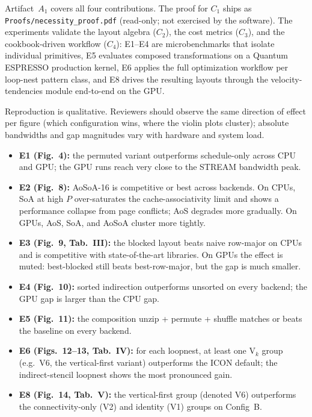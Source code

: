 \documentclass[conference]{IEEEtran}
\begin{document}
Artifact~$A_1$ covers all four contributions. The proof for $C_1$ ships as \texttt{Proofs/necessity\_proof.pdf} (read-only; not exercised by the software). The experiments validate the layout algebra ($C_2$), the cost metrics ($C_3$), and the cookbook-driven workflow ($C_4$): E1--E4 are microbenchmarks that isolate individual primitives, E5 evaluates composed transformations on a Quantum ESPRESSO production kernel, E6 applies the full optimization workflow per loop-nest pattern class, and E8 drives the resulting layouts through the velocity-tendencies module end-to-end on the GPU.

\artexp

Reproduction is qualitative. Reviewers should observe the same direction of effect per figure (which configuration wins, where the violin plots cluster); absolute bandwidths and gap magnitudes vary with hardware and system load.

\begin{itemize}\setlength{\itemsep}{1pt}\setlength{\parsep}{0pt}
\item \textbf{E1 (Fig.~4):} the permuted variant outperforms schedule-only across CPU and GPU; the GPU runs reach very close to the STREAM bandwidth peak.
\item \textbf{E2 (Fig.~8):} AoSoA-16 is competitive or best across backends. On CPUs, SoA at high $P$ over-saturates the cache-associativity limit and shows a performance collapse from page conflicts; AoS degrades more gradually. On GPUs, AoS, SoA, and AoSoA cluster more tightly.
\item \textbf{E3 (Fig.~9, Tab.~III):} the blocked layout beats naive row-major on CPUs and is competitive with state-of-the-art libraries. On GPUs the effect is muted: best-blocked still beats best-row-major, but the gap is much smaller.
\item \textbf{E4 (Fig.~10):} sorted indirection outperforms unsorted on every backend; the GPU gap is larger than the CPU gap.
\item \textbf{E5 (Fig.~11):} the composition unzip + permute + shuffle matches or beats the baseline on every backend.
\item \textbf{E6 (Figs.~12--13, Tab.~IV):} for each loopnest, at least one V$_k$ group (e.g.\ V6, the vertical-first variant) outperforms the ICON default; the indirect-stencil loopnest shows the most pronounced gain.
\item \textbf{E8 (Fig.~14, Tab.~V):} the vertical-first group (denoted V6) outperforms the connectivity-only (V2) and identity (V1) groups on Config~B.
\end{itemize}
\end{document}
